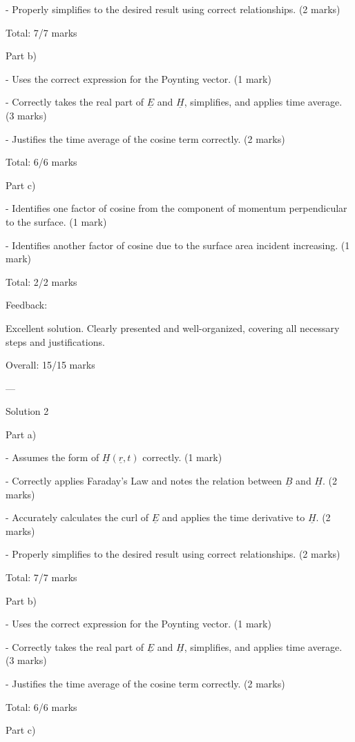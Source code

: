 \documentclass[a4paper,11pt]{article}
\begin{document}
- Properly simplifies to the desired result using correct relationships. (2 marks)

Total: 7/7 marks

Part b)

- Uses the correct expression for the Poynting vector. (1 mark)

- Correctly takes the real part of \(\underline{E}\) and \(\underline{H}\), simplifies, and applies time average. (3 marks)

- Justifies the time average of the cosine term correctly. (2 marks)

Total: 6/6 marks

Part c)

- Identifies one factor of cosine from the component of momentum perpendicular to the surface. (1 mark)

- Identifies another factor of cosine due to the surface area incident increasing. (1 mark)

Total: 2/2 marks

Feedback:

Excellent solution. Clearly presented and well-organized, covering all necessary steps and justifications.

Overall: 15/15 marks

---

Solution 2

Part a)

- Assumes the form of \(\underline{H}(\underline{r}, t)\) correctly. (1 mark)

- Correctly applies Faraday's Law and notes the relation between \(\underline{B}\) and \(\underline{H}\). (2 marks)

- Accurately calculates the curl of \(\underline{E}\) and applies the time derivative to \(\underline{H}\). (2 marks)

- Properly simplifies to the desired result using correct relationships. (2 marks)

Total: 7/7 marks

Part b)

- Uses the correct expression for the Poynting vector. (1 mark)

- Correctly takes the real part of \(\underline{E}\) and \(\underline{H}\), simplifies, and applies time average. (3 marks)

- Justifies the time average of the cosine term correctly. (2 marks)

Total: 6/6 marks

Part c)
\end{document}
